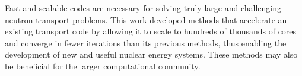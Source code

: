 Fast and scalable codes are necessary for solving truly large and challenging neutron transport problems. This work developed methods that accelerate an existing transport code by allowing it to scale to hundreds of thousands of cores and converge in fewer iterations than its previous methods, thus enabling the development of new and useful nuclear energy systems. These methods may also be beneficial for the larger computational community.

\separatorpage{}  
